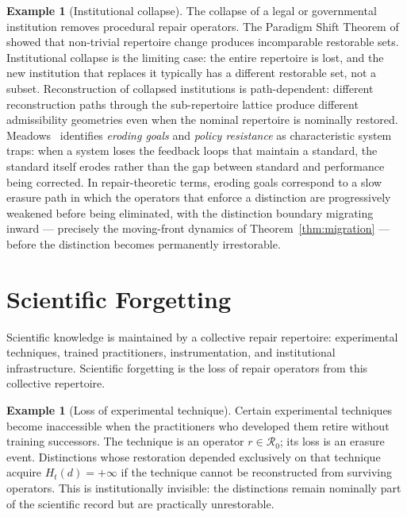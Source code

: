 \documentclass[12pt, oneside]{article}
\theoremstyle{plain}
\theoremstyle{definition}
\newtheorem{example}[theorem]{Example}
\theoremstyle{remark}
\newcommand{\Rzero}{\mathcal{R}_0}
\newcommand{\Hyster}{H}
\begin{document}
\begin{example}[Institutional collapse]
  The collapse of a legal or governmental institution removes
  procedural repair operators.
  The Paradigm Shift Theorem of \cite{Flyxion2026a} showed that
  non-trivial repertoire change produces incomparable restorable
  sets.
  Institutional collapse is the limiting case: the entire
  repertoire is lost, and the new institution that replaces it
  typically has a different restorable set, not a subset.
  Reconstruction of collapsed institutions is path-dependent:
  different reconstruction paths through the sub-repertoire lattice
  produce different admissibility geometries even when the
  nominal repertoire is nominally restored.
  Meadows~\cite{Meadows2008} identifies \emph{eroding goals} and
  \emph{policy resistance} as characteristic system traps: when
  a system loses the feedback loops that maintain a standard, the
  standard itself erodes rather than the gap between standard and
  performance being corrected.
  In repair-theoretic terms, eroding goals correspond to a slow
  erasure path in which the operators that enforce a distinction
  are progressively weakened before being eliminated, with the
  distinction boundary migrating inward --- precisely the
  moving-front dynamics of Theorem~\ref{thm:migration} --- before
  the distinction becomes permanently irrestorable.
\end{example}


\section{Scientific Forgetting}
\label{sec:science}

Scientific knowledge is maintained by a collective repair
repertoire: experimental techniques, trained practitioners,
instrumentation, and institutional infrastructure.
Scientific forgetting is the loss of repair operators from this
collective repertoire.

\begin{example}[Loss of experimental technique]
  Certain experimental techniques become inaccessible when the
  practitioners who developed them retire without training
  successors.
  The technique is an operator $r \in \Rzero$; its loss is an
  erasure event.
  Distinctions whose restoration depended exclusively on that
  technique acquire $\Hyster_t(d) = +\infty$ if the technique
  cannot be reconstructed from surviving operators.
  This is institutionally invisible: the distinctions remain
  nominally part of the scientific record but are practically
  unrestorable.
\end{example}
\end{document}

